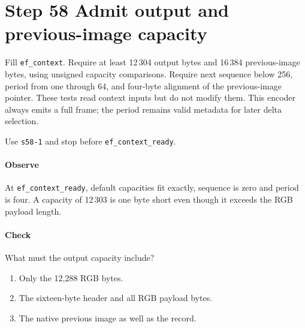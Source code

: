 \section{Step 58 Admit output and previous-image capacity}
Fill \texttt{ef\_context}. Require at least 12\,304 output bytes and 16\,384 previous-image bytes, using unsigned capacity comparisons. Require next sequence below 256, period from one through 64, and four-byte alignment of the previous-image pointer. These tests read context inputs but do not modify them. This encoder always emits a full frame; the period remains valid metadata for later delta selection.

Use \texttt{s58-1} and stop before \texttt{ef\_context\_ready}.

\paragraph{Observe} At \texttt{ef\_context\_ready}, default capacities fit exactly, sequence is zero and period is four. A capacity of 12\,303 is one byte short even though it exceeds the RGB payload length.

\paragraph{Check} What must the output capacity include?
\begin{enumerate}[label=\Alph*.]
  \item Only the 12,288 RGB bytes.
  \item The sixteen-byte header and all RGB payload bytes.
  \item The native previous image as well as the record.
\end{enumerate}
